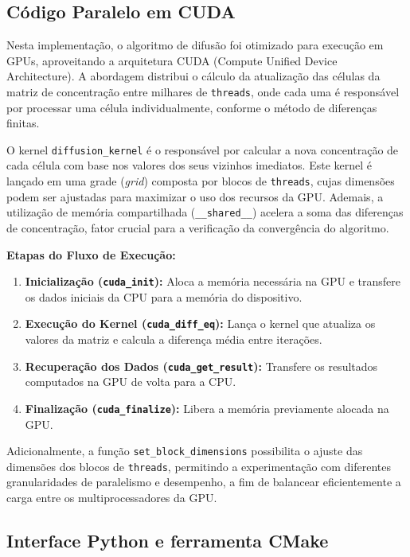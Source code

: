 \documentclass[12pt]{article}
\begin{document}
\subsection{Código Paralelo em CUDA}

Nesta implementação, o algoritmo de difusão foi otimizado para execução em
GPUs, aproveitando a arquitetura CUDA (Compute Unified Device Architecture). A
abordagem distribui o cálculo da atualização das células da matriz de
concentração entre milhares de \texttt{threads}, onde cada uma é responsável
por processar uma célula individualmente, conforme o método de diferenças
finitas.

O kernel \texttt{diffusion\_kernel} é o responsável por calcular a nova
concentração de cada célula com base nos valores dos seus vizinhos imediatos.
Este kernel é lançado em uma grade (\textit{grid}) composta por blocos de
\texttt{threads}, cujas dimensões podem ser ajustadas para maximizar o uso dos
recursos da GPU. Ademais, a utilização de memória compartilhada
(\texttt{\_\_shared\_\_}) acelera a soma das diferenças de concentração, fator
crucial para a verificação da convergência do algoritmo.

\textbf{Etapas do Fluxo de Execução:}
\begin{enumerate}
  \item \textbf{Inicialização (\texttt{cuda\_init}):}
        Aloca a memória necessária na GPU e transfere os dados iniciais da CPU para a memória do dispositivo.

  \item \textbf{Execução do Kernel (\texttt{cuda\_diff\_eq}):}
        Lança o kernel que atualiza os valores da matriz e calcula a diferença média entre iterações.

  \item \textbf{Recuperação dos Dados (\texttt{cuda\_get\_result}):}
        Transfere os resultados computados na GPU de volta para a CPU.

  \item \textbf{Finalização (\texttt{cuda\_finalize}):}
        Libera a memória previamente alocada na GPU.
\end{enumerate}

Adicionalmente, a função \texttt{set\_block\_dimensions} possibilita o ajuste
das dimensões dos blocos de \texttt{threads}, permitindo a experimentação com
diferentes granularidades de paralelismo e desempenho, a fim de balancear
eficientemente a carga entre os multiprocessadores da GPU.

\subsection{Interface Python e ferramenta CMake}
\end{document}
